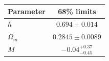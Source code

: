 \begin{tabular} { l  c}

 Parameter &  68\% limits\\
\hline
{\boldmath$h              $} & $0.694\pm 0.014            $\\

{\boldmath$Ω_m            $} & $0.2845\pm 0.0089          $\\

{\boldmath$M              $} & $-0.04^{+0.37}_{-0.45}     $\\
\hline
\end{tabular}